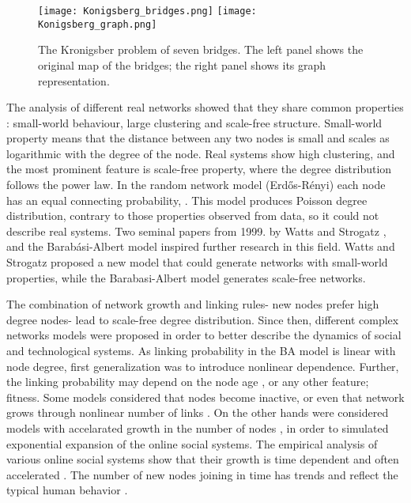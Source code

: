 \begin{figure}[!ht]
	\centering
	\texttt{[image: Konigsberg\_bridges.png]} \hspace{2cm}
	\texttt{[image: Konigsberg\_graph.png]}
	\caption[Konigsberg problem of seven bridges.]{The Kronigsber problem of seven bridges. The left panel shows the original map of the bridges; the right panel shows its graph representation. }

	\label{fig:Krgraph}
\end{figure}
The analysis of different real networks showed that they share common properties \cite{boccaletti2006complex}: small-world behaviour, large clustering and scale-free structure. Small-world property means that the distance between any two nodes is small and scales as logarithmic with the degree of the node. Real systems show high clustering, and the most prominent feature is scale-free property, where the degree distribution follows the power law. In the random network model (Erdős-Rényi) each node has an equal connecting probability, \cite{dorogovtsev2010complex}. This model produces Poisson degree distribution, contrary to those properties observed from data, so it could not describe real systems. Two seminal papers from 1999. by Watts and Strogatz \cite{watts1998collective}, and the Barabási-Albert model \cite{barabasi1999} inspired further research in this field. Watts and Strogatz  \cite{watts1998collective} proposed a new model that could generate networks with small-world properties, while the Barabasi-Albert model generates scale-free networks. 

The combination of network growth and linking rules- new nodes prefer high degree nodes- lead to scale-free degree distribution. Since then, different complex networks models were proposed in order to better describe the dynamics of social and technological systems. As linking probability in the BA model is linear with node degree, first generalization was to introduce nonlinear dependence. Further, the linking probability may depend on the node age \cite{dorogovtsev2000b, dorogovtsev2001b}, or any other feature; fitness. Some models considered that nodes become inactive, or even that network grows through nonlinear number of links \cite{pham2016}. On the other hands were considered models with accelarated growth in the number of nodes \cite{sen2004}, in order to simulated exponential expansion of the online social systems. The empirical analysis of various online social systems show that their growth is time dependent and often accelerated \cite{liu2019}. The number of new nodes joining in time has trends and reflect the typical human behavior \cite{mitrovic2010a, mitrovic2012, mitrovic2015 }. 


